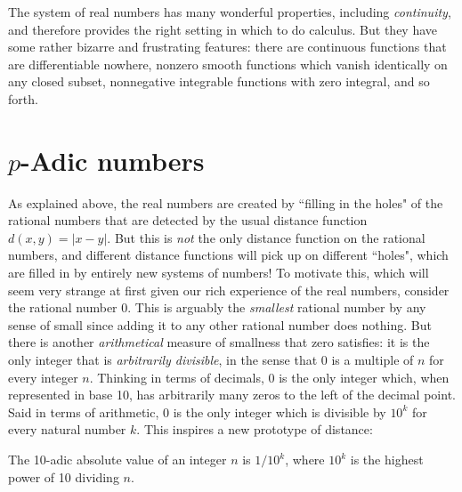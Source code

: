 \documentclass[11pt,oneside]{amsart}
\begin{document}
The system of real numbers has many wonderful properties, including {\em continuity}, and therefore provides the right setting
in which to do calculus.  But they have some rather bizarre and frustrating features: there are continuous functions that are differentiable 
nowhere, nonzero smooth functions which vanish identically on any closed subset, nonnegative integrable functions with zero integral, and so forth.


\section{$p$-Adic numbers}

As explained above, the real numbers are created by ``filling in the holes" of the rational numbers that are detected by the
usual distance function $d(x,y)=|x-y|$.  
But this is {\em not} the only distance function on the rational numbers, and
different distance functions will pick up on different ``holes", which are filled in by entirely new systems of numbers!
To motivate this, which will seem very strange at first given our rich experience of the real numbers, consider the rational
number 0.  This is arguably the {\em smallest} rational number by any sense of small since adding it to any other rational number
does nothing.  But there is another {\em arithmetical} measure of smallness that zero satisfies: it is the only integer
that is {\em arbitrarily divisible}, in the sense that $0$ is a multiple of $n$ for every integer $n$.  Thinking in terms of 
decimals, $0$ is the only integer which, when represented in base 10, has arbitrarily many zeros to the left of the decimal point.
Said in terms of arithmetic, 0 is the only integer which is divisible by $10^k$ for every natural number $k$.
This inspires a new prototype of distance:

\begin{definition}
	The 10-adic absolute value of an integer $n$ is $1/10^k$, where $10^k$ is the highest power of
	10 dividing $n$.
\end{definition}  
\end{document}
